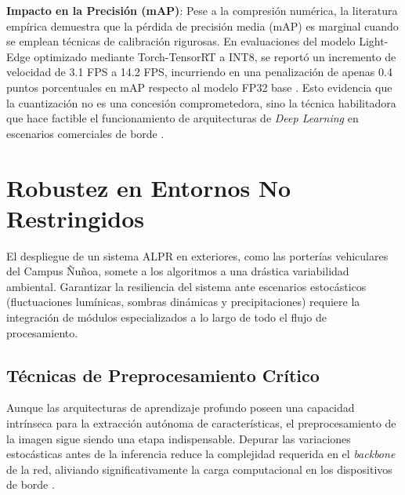\textbf{Impacto en la Precisión (mAP)}: 
Pese a la compresión numérica, la literatura empírica demuestra que la pérdida de 
precisión media (mAP) es marginal cuando se emplean técnicas de calibración rigurosas. 
En evaluaciones del modelo Light-Edge optimizado mediante Torch-TensorRT a INT8, se 
reportó un incremento de velocidad de 3.1 FPS a 14.2 FPS, incurriendo en una penalización 
de apenas 0.4 puntos porcentuales en mAP respecto al modelo FP32 base 
\parencite{sonnaraEfficientRealtimeLicense2025}. 
Esto evidencia que la cuantización no es una concesión comprometedora, sino la técnica 
habilitadora que hace factible el funcionamiento de arquitecturas de \textit{Deep Learning} 
en escenarios comerciales de borde 
\parencite{sonnaraEfficientRealtimeLicense2025, swatiEfficientDeepLearning2024}.


\section{Robustez en Entornos No Restringidos}

El despliegue de un sistema ALPR en exteriores, como las porterías vehiculares del 
Campus Ñuñoa, somete a los algoritmos a una drástica variabilidad ambiental. 
Garantizar la resiliencia del sistema ante escenarios estocásticos (fluctuaciones 
lumínicas, sombras dinámicas y precipitaciones) requiere la integración de módulos 
especializados a lo largo de todo el flujo de procesamiento.

\subsection{Técnicas de Preprocesamiento Crítico}

Aunque las arquitecturas de aprendizaje profundo poseen una capacidad intrínseca para 
la extracción autónoma de características, el preprocesamiento de la imagen sigue 
siendo una etapa indispensable. Depurar las variaciones estocásticas antes de la 
inferencia reduce la complejidad requerida en el \textit{backbone} de la red, 
aliviando significativamente la carga computacional en los dispositivos de borde 
\parencite{kuyunsaDeepLearningEnhancedAutomatic2025, xiongLicensePlateRecognition2026}.

